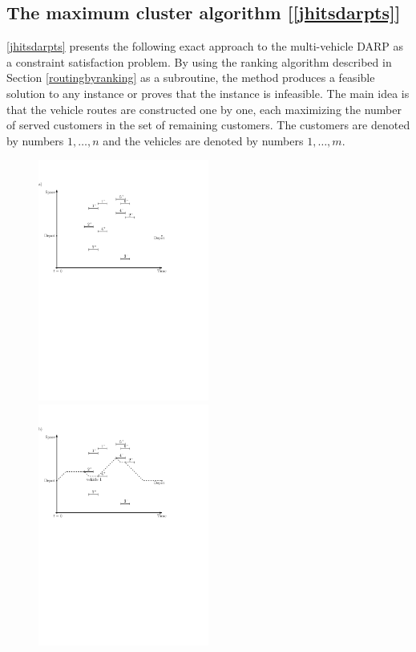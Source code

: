 \documentclass[dissertation,draft*]{aaltoseries}
\begin{document}
\subsection{The maximum cluster algorithm [\ref{jhitsdarpts}]}
\label{mvsolution}
\ref{jhitsdarpts} presents the following exact approach to the multi-vehicle DARP as a constraint satisfaction problem.
By using the ranking algorithm  described in Section \ref{routingbyranking} as a subroutine,
 the method produces a feasible solution to 
any instance or proves that the instance is infeasible. The main idea is that the vehicle routes are constructed
one by one, each maximizing the number of served customers in the set of remaining customers.
The customers are denoted by numbers $1,\ldots,n$ and the vehicles are denoted by numbers $1,\ldots,m$.

\begin{figure}[ht]
\includegraphics[width=0.5\textwidth]{greedy01b.pdf} \ 
\includegraphics[width=0.5\textwidth]{greedy05b.pdf}  \\ \ \\  

\end{figure}
\end{document}
